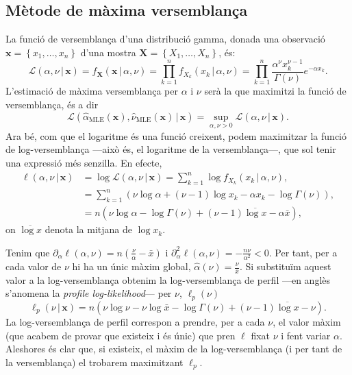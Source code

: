 \documentclass[12pt, catalan]{article}
\numberwithin{table}{section}
\numberwithin{figure}{section}
\numberwithin{equation}{section}
\newcommand{\cond}{\, \vert \,}
\renewcommand{\L}{\mathcal{L}}
\begin{document}
\subsection{Mètode de màxima versemblança}
La funció de versemblança d'una distribució gamma, donada una observació $\mathbf{x} = \left\{x_1, \dots, x_n\right\}$ d'una mostra $\mathbf{X} = \left\{X_1, \dots, X_n\right\}$, és:
\begin{equation*}
    \L(\alpha, \nu \cond \mathbf{x}) = f_{\mathbf{X}}(\mathbf{x} \cond \alpha, \nu) = \prod_{k = 1}^n f_{X_k}(x_k \cond \alpha, \nu) = \prod_{k = 1}^n \frac{\alpha^\nu x_k^{\nu - 1}}{\Gamma(\nu)}  e^{-\alpha x_k}.
\end{equation*}
L'estimació de màxima versemblança per $\alpha$ i $\nu$ serà la que maximitzi la funció de versemblança, és a dir
\begin{equation*}
    \L(\hat{\alpha}_\text{MLE}(\mathbf{x}), \hat{\nu}_\text{MLE}(\mathbf{x}) \cond \mathbf{x}) = \sup_{\alpha, \nu > 0} \L(\alpha, \nu \cond \mathbf{x}).
\end{equation*}
Ara bé, com que el logaritme és una funció creixent, podem maximitzar la funció de log-versemblança ---això és, el logaritme de la versemblança---, que sol tenir una expressió més senzilla. En efecte,
\begin{align}\label{eq:log-likelihood}
     \ell(\alpha, \nu \cond \mathbf{x}) & = \log{\L(\alpha, \nu \cond \mathbf{x})} = \sum_{k = 1}^n \log{f_{X_k}(x_k \cond \alpha, \nu)} \nonumber, \\
     & = \sum_{k = 1}^n (\nu \log{\alpha} + (\nu - 1) \log{x_k} - \alpha x_k - \log{\Gamma(\nu)}) \nonumber, \\
     & = n (\nu \log{\alpha} - \log{\Gamma(\nu)} + (\nu - 1)\overline{\log{x}} - \alpha \bar{x}),
\end{align}
on $\overline{\log{x}}$ denota la mitjana de $\log{x_k}$. 

Tenim que $\partial_\alpha \ell(\alpha, \nu) = n \left(\tfrac{\nu}{\alpha} - \bar{x}\right)$ i $\partial^2_\alpha \ell(\alpha, \nu) = -\tfrac{n\nu}{\alpha^2} < 0$. Per tant, per a cada valor de $\nu$ hi ha un únic màxim global, $\hat{\alpha}(\nu) = \tfrac{\nu}{\bar{x}}$. Si substituïm aquest valor a la log-versemblança obtenim la log-versemblança de perfil ---en anglès s'anomena la \emph{profile log-likelihood}--- per $\nu$, $\ell_p(\nu)$
\begin{equation}\label{eq:profile likelihood}
    \ell_p(\nu \cond \mathbf{x}) = n(\nu \log{\nu} - \nu \log{\bar{x}} - \log{\Gamma(\nu)} + (\nu - 1)\overline{\log{x}} - \nu). 
\end{equation}
La log-versemblança de perfil correspon a prendre, per a cada $\nu$, el valor màxim (que acabem de provar que existeix i és únic) que pren $\ell$ fixat $\nu$ i fent variar $\alpha$. Aleshores és clar que, si existeix, el màxim de la log-versemblança (i per tant de la versemblança) el trobarem maximitzant $\ell_p$. 
\end{document}
